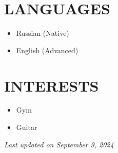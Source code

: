 \documentclass[11pt,a4paper]{moderncv}
\begin{document}
\begin{minipage}[t]{0.35\textwidth}
\section{LANGUAGES}
\begin{itemize}
    \item Russian (Native)
    \item English (Advanced)
\end{itemize}

\section{INTERESTS}
\begin{itemize}
    \item Gym
    \item Guitar
\end{itemize}
\end{minipage}

\vspace*{\fill}
\begin{center}
\textit{Last updated on September 9, 2024}
\end{center}
\vspace{-0.5cm}
\end{document}
